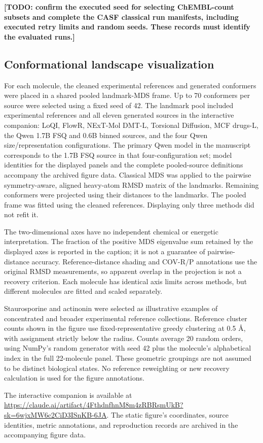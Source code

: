 \textbf{[TODO: confirm the executed seed for selecting ChEMBL-count subsets and
complete the CASF classical run manifests, including executed retry limits and
random seeds. These records must identify the evaluated runs.]}

\subsection*{Conformational landscape visualization}

For each molecule, the cleaned experimental references and generated conformers were
placed in a shared pooled landmark-MDS frame. Up to 70 conformers per source were selected
using a fixed seed of 42. The landmark pool included experimental references and all eleven
generated sources in the interactive companion: LoQI, FlowR, NExT-Mol DMT-L, Torsional
Diffusion, MCF drugs-L, the Qwen 1.7B FSQ and 0.6B binned sources, and the four Qwen
size/representation configurations. The primary Qwen model in the manuscript corresponds
to the 1.7B FSQ source in that four-configuration set; model identities for the displayed
panels and the complete pooled-source definitions accompany the archived figure data.
Classical MDS was applied to the pairwise symmetry-aware, aligned heavy-atom RMSD matrix
of the landmarks. Remaining conformers were projected using their distances to the
landmarks. The pooled frame was fitted using the cleaned references. Displaying only
three methods did not refit it.

The two-dimensional axes have no independent chemical or energetic interpretation.
The fraction of the positive MDS eigenvalue sum retained by the displayed axes is reported
in the caption; it is not a guarantee of pairwise-distance accuracy. Reference-distance
shading and COV-R/P annotations use the original RMSD measurements, so apparent overlap
in the projection is not a recovery criterion. Each molecule has identical axis limits
across methods, but different molecules are fitted and scaled separately.

Staurosporine and actinonin were selected as illustrative examples of concentrated and
broader experimental reference collections. Reference cluster counts shown in the figure
use fixed-representative greedy clustering at 0.5 \AA{}, with assignment strictly below
the radius. Counts average 20 random orders, using NumPy's random generator with seed
42 plus the molecule's alphabetical index in the full 22-molecule panel. These geometric
groupings are not assumed to be distinct biological states. No reference reweighting
or new recovery calculation is used for the figure annotations.

The interactive companion is available at
\url{https://claude.ai/artifact/4FthdnfhnM8m4zRBRsmUkB?sk=6wjxMW6c2CiD3ISnKB-6JA}.
The static figure's coordinates, source identities, metric annotations, and reproduction
records are archived in the accompanying figure data.
